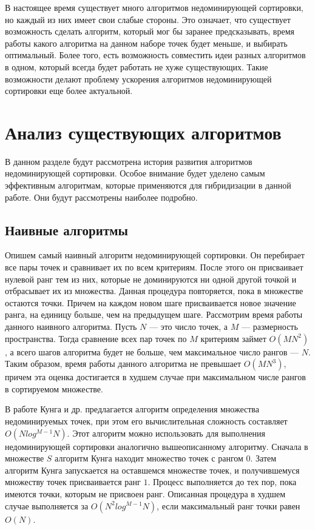 В настоящее время существует много алгоритмов недоминирующей сортировки, но каждый из них имеет свои слабые стороны. Это означает, что существует возможность сделать алгоритм, который мог бы заранее предсказывать, время работы какого алгоритма на данном наборе точек будет меньше, и выбирать оптимальный. Более того, есть возможность совместить идеи разных алгоритмов в одном, который всегда будет работать не хуже существующих. Такие возможности делают проблему ускорения алгоритмов недоминирующей сортировки еще более актуальной.

\section{Анализ существующих алгоритмов}

В данном разделе будут рассмотрена история развития алгоритмов недоминирующей сортировки. Особое внимание будет уделено самым эффективным алгоритмам, которые применяются для гибридизации в данной работе. Они будут рассмотрены наиболее подробно.

\subsection{Наивные алгоритмы}

Опишем самый наивный алгоритм недоминирующей сортировки. Он перебирает все пары точек и сравнивает их по всем критериям. После этого он присваивает нулевой ранг тем из них, которые не доминируются ни одной  другой точкой и отбрасывает их из множества. Данная процедура повторяется, пока в множестве остаются точки. Причем на каждом новом шаге присваивается новое значение ранга, на единицу больше, чем на предыдущем шаге. Рассмотрим время работы данного наивного алгоритма. Пусть $N$ {---} это число точек, а $M$ {---} размерность пространства. Тогда сравнение всех пар точек по $M$ критериям займет $O(MN^2)$, а всего шагов алгоритма будет не больше, чем максимальное число рангов {---} $N$. Таким образом, время работы данного алгоритма не превышает $O(MN^3)$, причем эта оценка достигается в худшем случае при максимальном числе рангов в сортируемом множестве.

В работе Кунга и др. \cite{Kung} предлагается алгоритм определения множества недоминируемых точек, при этом его вычислительная сложность составляет $O(N log^{M-1} N)$. Этот алгоритм можно использовать для выполнения недоминирующей сортировки аналогично вышеописанному алгоритму. Сначала в множестве $S$ алгоритм Кунга находит множество точек с рангом $0$. Затем алгоритм Кунга запускается на оставшемся множестве точек, и получившемуся множеству точек присваивается ранг $1$. Процесс выполняется до тех пор, пока имеются точки, которым не присвоен ранг. Описанная процедура в худшем случае выполняется за $O(N^2 log^{M-1} N)$, если максимальный ранг точки равен $O(N)$.

